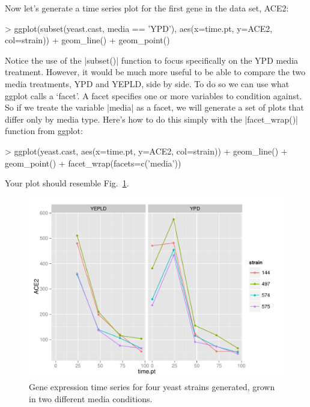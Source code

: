 Now let's generate a time series plot for the first gene in the data set, ACE2:
\begin{R}
> ggplot(subset(yeast.cast, media == 'YPD'), 
        aes(x=time.pt, y=ACE2, col=strain)) + geom_line() + geom_point()
\end{R}
%
Notice the use of the |subset()| function to focus specifically on the YPD media treatment.  However, it would be much more useful to be able to compare the two media treatments, YPD and YEPLD, side by side.  To do so we can use what ggplot calls a `facet'.  A facet  specifies one or more variables to condition against.  So if we treate the variable |media| as a facet, we will generate a set of plots that differ only by media type.  Here's how to do this simply with the |facet_wrap()| function from ggplot:
\begin{R}
> ggplot(yeast.cast, aes(x=time.pt, y=ACE2, col=strain)) + geom_line() + geom_point() + facet_wrap(facets=c('media'))
\end{R}
%
Your plot should resemble Fig.~\ref{fig:yeasttime}.
\begin{figure}[htbp]
\centering
\includegraphics[width=0.7\columnwidth]{./figures/hands-on3/yeast-timeseries-plot.pdf}
\caption{Gene expression time series for four yeast strains generated, grown in two different media conditions.\label{fig:yeasttime}}
\end{figure}
